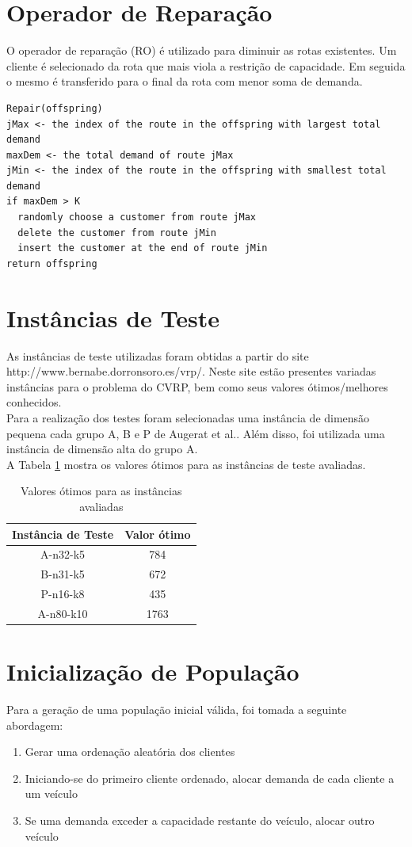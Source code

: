 \documentclass[conference]{IEEEtran}
\begin{document}
\section{Operador de Reparação}
O operador de reparação (RO) é utilizado para diminuir as rotas existentes. Um cliente é selecionado da rota que mais viola a restrição de capacidade. Em seguida o mesmo é transferido para o final da rota com menor soma de demanda.
\begin{verbatim}
Repair(offspring)
jMax <- the index of the route in the offspring with largest total demand
maxDem <- the total demand of route jMax 
jMin <- the index of the route in the offspring with smallest total demand
if maxDem > K
  randomly choose a customer from route jMax
  delete the customer from route jMin
  insert the customer at the end of route jMin
return offspring
\end{verbatim}


\section{Instâncias de Teste}
As instâncias de teste utilizadas foram obtidas a partir do site http://www.bernabe.dorronsoro.es/vrp/. Neste site estão presentes variadas instâncias para o problema do CVRP, bem como seus valores ótimos/melhores conhecidos.\\
Para a realização dos testes foram selecionadas uma instância de dimensão pequena cada grupo A, B e P de Augerat et al.. Além disso, foi utilizada uma instância de dimensão alta do grupo A.\\
A Tabela \ref{table_optimum} mostra os valores ótimos para as instâncias de teste avaliadas.

\begin{table}[!t]
\renewcommand{\arraystretch}{1.3}
\caption{Valores ótimos para as instâncias avaliadas}
\label{table_optimum}
\centering
\begin{tabular}{|c||c|}
\hline
Instância de Teste & Valor ótimo\\
\hline
A-n32-k5 & 784\\
B-n31-k5 & 672\\
P-n16-k8 & 435\\
A-n80-k10 & 1763\\
\hline
\end{tabular}
\end{table}


\section{Inicialização de População}
Para a geração de uma população inicial válida, foi tomada a seguinte abordagem:
\begin{enumerate}
\item Gerar uma ordenação aleatória dos clientes
\item Iniciando-se do primeiro cliente ordenado, alocar demanda de cada cliente a um veículo
\item Se uma demanda exceder a capacidade restante do veículo, alocar outro veículo
\end{enumerate}
\end{document}
